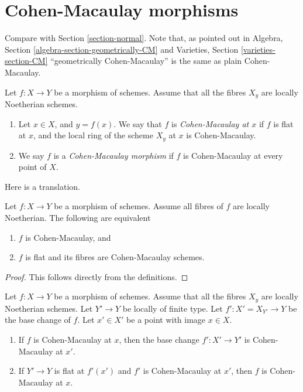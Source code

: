 \section{Cohen-Macaulay morphisms}
\label{section-CM}

\noindent
Compare with Section \ref{section-normal}.
Note that, as pointed out in
Algebra, Section \ref{algebra-section-geometrically-CM}
and
Varieties, Section \ref{varieties-section-CM}
``geometrically Cohen-Macaulay'' is the same as plain Cohen-Macaulay.

\begin{definition}
\label{definition-CM}
Let $f : X \to Y$ be a morphism of schemes.
Assume that all the fibres $X_y$ are locally Noetherian schemes.
\begin{enumerate}
\item Let $x \in X$, and $y = f(x)$. We say that $f$ is
{\it Cohen-Macaulay at $x$} if $f$ is flat at $x$, and the
local ring of the scheme $X_y$ at $x$ is Cohen-Macaulay.
\item We say $f$ is a {\it Cohen-Macaulay morphism} if $f$ is
Cohen-Macaulay at every point of $X$.
\end{enumerate}
\end{definition}

\noindent
Here is a translation.

\begin{lemma}
\label{lemma-CM}
Let $f : X \to Y$ be a morphism of schemes.
Assume all fibres of $f$ are locally Noetherian.
The following are equivalent
\begin{enumerate}
\item $f$ is Cohen-Macaulay, and
\item $f$ is flat and its fibres are Cohen-Macaulay schemes.
\end{enumerate}
\end{lemma}

\begin{proof}
This follows directly from the definitions.
\end{proof}

\begin{lemma}
\label{lemma-base-change-CM}
Let $f : X \to Y$ be a morphism of schemes.
Assume that all the fibres $X_y$ are locally Noetherian schemes.
Let $Y' \to Y$ be locally of finite type. Let $f' : X' = X_{Y'} \to Y$
be the base change of $f$.
Let $x' \in X'$ be a point with image $x \in X$.
\begin{enumerate}
\item If $f$ is Cohen-Macaulay at $x$, then the base change
$f' : X' \to Y'$ is Cohen-Macaulay at $x'$.
\item If $Y' \to Y$ is flat at $f'(x')$ and $f'$ is Cohen-Macaulay at
$x'$, then $f$ is Cohen-Macaulay at $x$.
\end{enumerate}
\end{lemma}

